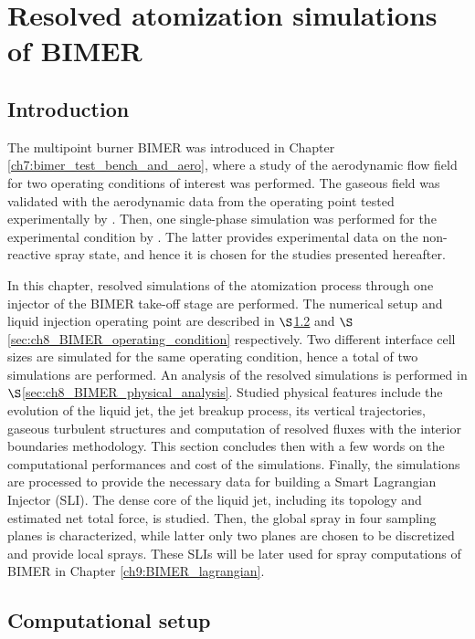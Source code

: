\chapter{Resolved atomization simulations of BIMER}
\label{ch8:bimer_resolved_atomization}


\section{Introduction}

The multipoint burner BIMER was introduced in Chapter \ref{ch7:bimer_test_bench_and_aero}, where a study of the aerodynamic flow field for two operating conditions of interest was performed. The gaseous field was validated with the aerodynamic data from the operating point tested experimentally by . Then, one single-phase simulation was performed for the experimental condition by . The latter provides experimental data on the non-reactive spray state, and hence it is chosen for the studies presented hereafter.

In this chapter, resolved simulations of the atomization process through one injector of the BIMER take-off stage are performed. The numerical setup and liquid injection operating point are described in $\S$\ref{sec:ch8_BIMER_computational_setup} and $\S$\ref{sec:ch8_BIMER_operating_condition} respectively. Two different interface cell sizes are simulated for the same operating condition, hence a total of two simulations are performed. An analysis of the resolved simulations is performed in $\S$\ref{sec:ch8_BIMER_physical_analysis}. Studied physical features include the evolution of the liquid jet, the jet breakup process, its vertical trajectories, gaseous turbulent structures and computation of resolved fluxes with the interior boundaries methodology. This section concludes then with a few words on the computational performances and cost of the simulations. Finally, the simulations are processed to provide the necessary data for building a Smart Lagrangian Injector (SLI). The dense core of the liquid jet, including its topology and estimated net total force, is studied. Then, the global spray in four sampling planes is characterized, while latter only two planes are chosen to be discretized and provide local sprays. These SLIs will be later used for spray computations of BIMER in Chapter \ref{ch9:BIMER_lagrangian}. 



\section{Computational setup}
\label{sec:ch8_BIMER_computational_setup}

